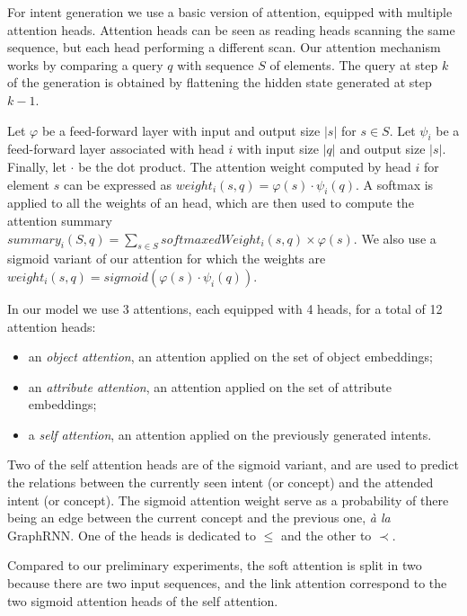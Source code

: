 For intent generation we use a basic version of attention, equipped with multiple attention heads.
Attention heads can be seen as reading heads scanning the same sequence, but each head performing a different scan.
Our attention mechanism works by comparing a query $q$ with sequence $S$ of elements.
The query at step $k$ of the generation is obtained by flattening the hidden state generated at step $k-1$.

Let $\varphi$ be a feed-forward layer with input and output size $|s|$ for $s\in S$.
Let $\psi_i$ be a feed-forward layer associated with head $i$ with input size $|q|$ and output size $|s|$.
Finally, let $\cdot$ be the dot product.
The attention weight computed by head $i$ for element $s$ can be expressed as $weight_i(s,q) = \varphi(s) \cdot \psi_i(q)$.
A softmax is applied to all the weights of an head, which are then used to compute the attention summary $summary_i(S,q) = \sum_{s\in S} softmaxedWeight_i(s,q) \times \varphi(s)$.
We also use a sigmoid variant of our attention for which the weights are $weight_i(s,q) = sigmoid(\varphi(s) \cdot \psi_i(q))$.

In our model we use 3 attentions, each equipped with 4 heads, for a total of 12 attention heads:\begin{itemize}
    \item an \textit{object attention}, an attention applied on the set of object embeddings;
    \item an \textit{attribute attention}, an attention applied on the set of attribute embeddings;
    \item a \textit{self attention}, an attention applied on the previously generated intents.
\end{itemize}
Two of the self attention heads are of the sigmoid variant, and are used to predict the relations between the currently seen intent (or concept) and the attended intent (or concept). The sigmoid attention weight serve as a probability of there being an edge between the current concept and the previous one, \textit{à la} GraphRNN.
One of the heads is dedicated to $\leq$ and the other to $\prec$.

Compared to our preliminary experiments, the soft attention is split in two because there are two input sequences, and the link attention correspond to the two sigmoid attention heads of the self attention.



